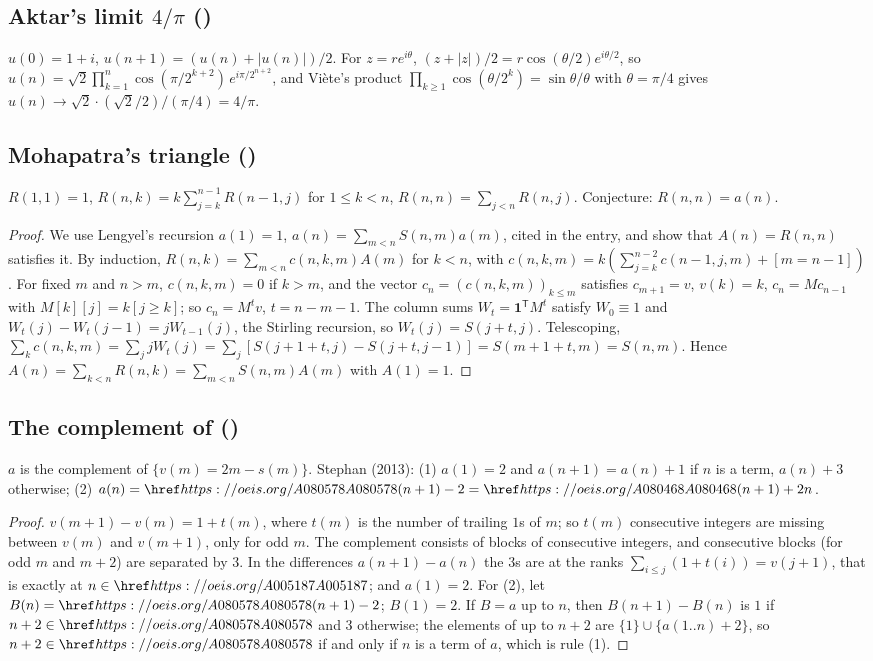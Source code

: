 \subsection{Aktar's limit \texorpdfstring{$4/\pi$}{4/pi} ()}\label{s:A088538}
$u(0)=1+i$, $u(n+1)=(u(n)+|u(n)|)/2$. For $z=re^{i\theta}$, $(z+|z|)/2=r\cos(\theta/2)e^{i\theta/2}$, so
$u(n)=\sqrt2\prod_{k=1}^n\cos(\pi/2^{k+2})\,e^{i\pi/2^{n+2}}$, and Viète's product $\prod_{k\ge1}\cos(\theta/2^k)=\sin\theta/\theta$
with $\theta=\pi/4$ gives $u(n)\to\sqrt2\cdot(\sqrt2/2)/(\pi/4)=4/\pi$.

\subsection{Mohapatra's triangle ()}\label{s:A005121}
$R(1,1)=1$, $R(n,k)=k\sum_{j=k}^{n-1}R(n-1,j)$ for $1\le k<n$, $R(n,n)=\sum_{j<n}R(n,j)$. Conjecture:
$R(n,n)=a(n)$.
\begin{proof} We use Lengyel's recursion $a(1)=1$, $a(n)=\sum_{m<n}S(n,m)a(m)$, cited in the entry, and show that
$A(n)=R(n,n)$ satisfies it. By induction, $R(n,k)=\sum_{m<n}c(n,k,m)A(m)$ for $k<n$, with
$c(n,k,m)=k(\sum_{j=k}^{n-2}c(n-1,j,m)+[m=n-1])$. For fixed $m$ and $n>m$, $c(n,k,m)=0$ if $k>m$, and the vector
$c_n=(c(n,k,m))_{k\le m}$ satisfies $c_{m+1}=v$, $v(k)=k$, $c_n=Mc_{n-1}$ with $M[k][j]=k[j\ge k]$; so $c_n=M^tv$,
$t=n-m-1$. The column sums $W_t=\mathbf1^{\mathsf T}M^t$ satisfy $W_0\equiv1$ and $W_t(j)-W_t(j-1)=jW_{t-1}(j)$, the
Stirling recursion, so $W_t(j)=S(j+t,j)$. Telescoping,
$\sum_kc(n,k,m)=\sum_jjW_t(j)=\sum_j[S(j+1+t,j)-S(j+t,j-1)]=S(m+1+t,m)=S(n,m)$. Hence
$A(n)=\sum_{k<n}R(n,k)=\sum_{m<n}S(n,m)A(m)$ with $A(1)=1$. \end{proof}

\subsection{The complement of  ()}\label{s:A055938}
$a$ is the complement of $\{v(m)=2m-s(m)\}$. Stephan (2013): (1) $a(1)=2$ and $a(n+1)=a(n)+1$ if $n$ is a term,
$a(n)+3$ otherwise; (2) $a(n)=\oeis{A080578}(n+1)-2=\oeis{A080468}(n+1)+2n$.
\begin{proof} $v(m+1)-v(m)=1+t(m)$, where $t(m)$ is the number of trailing $1$s of $m$; so $t(m)$ consecutive
integers are missing between $v(m)$ and $v(m+1)$, only for odd $m$. The complement consists of blocks of
consecutive integers, and consecutive blocks (for odd $m$ and $m+2$) are separated by $3$. In the differences
$a(n+1)-a(n)$ the $3$s are at the ranks $\sum_{i\le j}(1+t(i))=v(j+1)$, that is exactly at $n\in\oeis{A005187}$;
and $a(1)=2$. For (2), let $B(n)=\oeis{A080578}(n+1)-2$; $B(1)=2$. If $B=a$ up to $n$, then $B(n+1)-B(n)$ is $1$ if
$n+2\in\oeis{A080578}$ and $3$ otherwise; the elements of  up to $n+2$ are $\{1\}\cup\{a(1..n)+2\}$, so
$n+2\in\oeis{A080578}$ if and only if $n$ is a term of $a$, which is rule (1). \end{proof}

